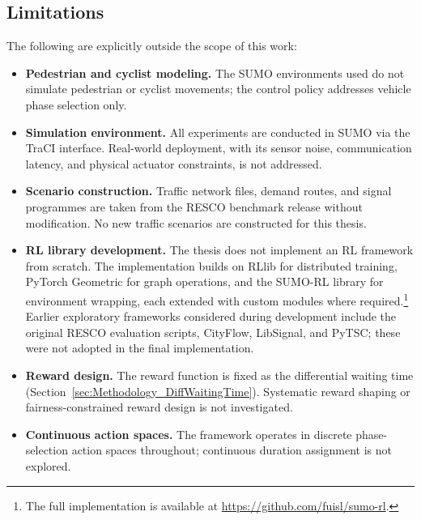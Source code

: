 \subsection{Limitations}
\label{sec:Introduction_Limitations}

The following are explicitly outside the scope of this work:

\begin{itemize}
  \item \textbf{Pedestrian and cyclist modeling.} The SUMO environments used do not simulate pedestrian or cyclist movements; the control policy addresses vehicle phase selection only.

  \item \textbf{Simulation environment.} All experiments are conducted in SUMO \citep{lopez2018microscopic} via the TraCI interface. Real-world deployment, with its sensor noise, communication latency, and physical actuator constraints, is not addressed.

  \item \textbf{Scenario construction.} Traffic network files, demand routes, and signal programmes are taken from the RESCO benchmark release without modification. No new traffic scenarios are constructed for this thesis.

  \item \textbf{RL library development.} The thesis does not implement an RL framework from scratch. The implementation builds on RLlib for distributed training, PyTorch Geometric for graph operations, and the SUMO-RL library \citep{alegre2021sumorl} for environment wrapping, each extended with custom modules where required.\footnote{The full implementation is available at \url{https://github.com/fuisl/sumo-rl}.} Earlier exploratory frameworks considered during development include the original RESCO evaluation scripts, CityFlow, LibSignal, and PyTSC; these were not adopted in the final implementation.

  \item \textbf{Reward design.} The reward function is fixed as the differential waiting time (Section~\ref{sec:Methodology_DiffWaitingTime}). Systematic reward shaping or fairness-constrained reward design is not investigated.

  \item \textbf{Continuous action spaces.} The framework operates in discrete phase-selection action spaces throughout; continuous duration assignment is not explored.
\end{itemize}

